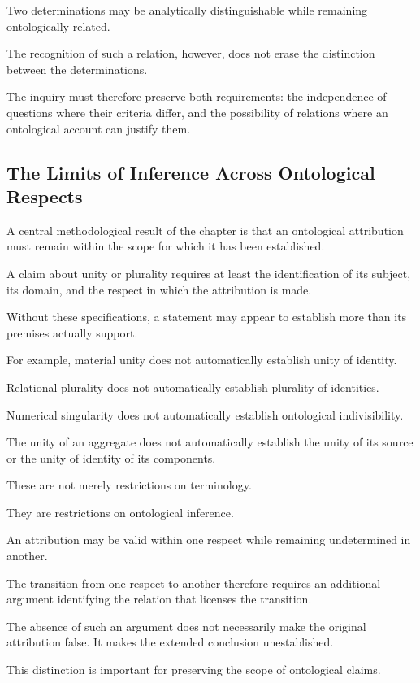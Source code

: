 Two determinations may be
analytically distinguishable
while remaining ontologically
related.

The recognition of such a
relation, however, does not
erase the distinction between
the determinations.

The inquiry must therefore
preserve both requirements:
the independence of questions
where their criteria differ,
and the possibility of relations
where an ontological account
can justify them.

\subsection{The Limits of Inference Across Ontological Respects}

A central methodological result
of the chapter is that an
ontological attribution must
remain within the scope for
which it has been established.

A claim about unity or plurality
requires at least the identification
of its subject, its domain,
and the respect in which the
attribution is made.

Without these specifications,
a statement may appear to
establish more than its premises
actually support.

For example, material unity
does not automatically establish
unity of identity.

Relational plurality does not
automatically establish plurality
of identities.

Numerical singularity does
not automatically establish
ontological indivisibility.

The unity of an aggregate
does not automatically establish
the unity of its source or
the unity of identity of its
components.

These are not merely restrictions
on terminology.

They are restrictions on
ontological inference.

An attribution may be valid
within one respect while remaining
undetermined in another.

The transition from one respect
to another therefore requires
an additional argument identifying
the relation that licenses
the transition.

The absence of such an argument
does not necessarily make the
original attribution false.
It makes the extended conclusion
unestablished.

This distinction is important
for preserving the scope of
ontological claims.

